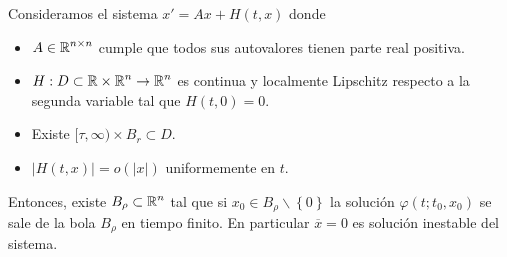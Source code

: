 \begin{prop}
Consideramos el sistema $\displaystyle x' = Ax + H\left(t, x\right) $ donde
\begin{itemize}
	\item $\displaystyle A \in \mathbb{R}^{n \times n} $ cumple que todos sus autovalores tienen parte real positiva.
\item $\displaystyle H : D \subset \mathbb{R} \times \mathbb{R}^{n}\to \mathbb{R}^{n}$ es continua y localmente Lipschitz respecto a la segunda variable tal que $\displaystyle H\left(t, 0\right)=0 $.
\item Existe $\displaystyle [\tau, \infty) \times B_{r} \subset D $. 
\item $\displaystyle \left|H\left(t,x\right)\right| = o\left( \left|x\right|\right) $ uniformemente en $\displaystyle t $.
\end{itemize}
Entonces, existe $\displaystyle B_{\rho }\subset \mathbb{R}^{n} $ tal que si $\displaystyle x_{0}\in B_{\rho }\backslash \left\{ 0\right\}  $ la solución $\displaystyle \varphi\left(t; t_{0}, x_{0}\right) $ se sale de la bola $\displaystyle B_{\rho } $ en tiempo finito. 
En particular $\displaystyle \overline{x}=0 $ es solución inestable del sistema. 
\end{prop}
